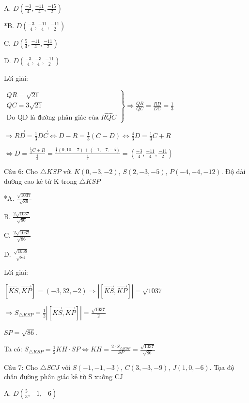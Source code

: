 \documentclass[a4paper,12pt]{article}
\begin{document}
A. \( D(\frac{-3}{4}, \frac{-11}{4}, \frac{-15}{2}) \)

*B. \( D(\frac{-3}{4}, \frac{-11}{4}, \frac{-11}{2}) \)

C. \( D(\frac{5}{4}, \frac{-11}{4}, \frac{-11}{2}) \)

D. \( D(\frac{-3}{4}, \frac{-3}{4}, \frac{-11}{2}) \)

Lời giải:

\(\left. \begin{array}{l}
QR = \sqrt{21} \\
QC = 3\sqrt{21} \\
\text{Do QD là đường phân giác của } \widehat{RQC}
\end{array} \right\} \Rightarrow \frac{QR}{QC} = \frac{RD}{DC} = \frac{1}{3}\)

\(\Rightarrow \overrightarrow{RD} = \frac{1}{3}\overrightarrow{DC} \Leftrightarrow D - R = \frac{1}{3}(C - D) \Leftrightarrow \frac{4}{3}D = \frac{1}{3}C + R\)

\(\Leftrightarrow D = \frac{\frac{1}{3}C + R}{\frac{4}{3}} = \frac{\frac{1}{3}(0, 10, -7) + (-1, -7, -5)}{\frac{4}{3}} = (\frac{-3}{4}, \frac{-11}{4}, \frac{-11}{2})\)

Câu 6: Cho \( \triangle KSP \) với \( K(0, -3, -2) \), \( S(2, -3, -5) \), \( P(-4, -4, -12) \). Độ dài đường cao kẻ từ K trong \( \triangle KSP \)

*A. \( \frac{\sqrt{1037}}{\sqrt{86}} \)

B. \( \frac{2\sqrt{1037}}{\sqrt{86}} \)

C. \( \frac{2\sqrt{1037}}{\sqrt{86}} \)

D. \( \frac{\sqrt{1038}}{\sqrt{86}} \)

Lời giải:

\([\overrightarrow{KS}, \overrightarrow{KP}] = (-3, 32, -2) \Rightarrow |[\overrightarrow{KS}, \overrightarrow{KP}]| = \sqrt{1037}\)

\(\Rightarrow S_{\triangle KSP} = \frac{1}{2} |[\overrightarrow{KS}, \overrightarrow{KP}]| = \frac{\sqrt{1037}}{2}\)

\(SP = \sqrt{86}\).

Ta có: \({}S_{\triangle KSP} = \frac{1}{2} KH \cdot SP \Leftrightarrow KH = \frac{2 \cdot S_{\triangle KSP}}{SP} = \frac{\sqrt{1037}}{\sqrt{86}}\)

Câu 7: Cho \( \triangle SCJ \) với \( S(-1, -1, -3) \), \( C(3, -3, -9) \), \( J(1, 0, -6) \). Tọa độ chân đường phân giác kẻ từ S xuống CJ

A. \( D(\frac{5}{3}, -1, -6) \)
\end{document}

